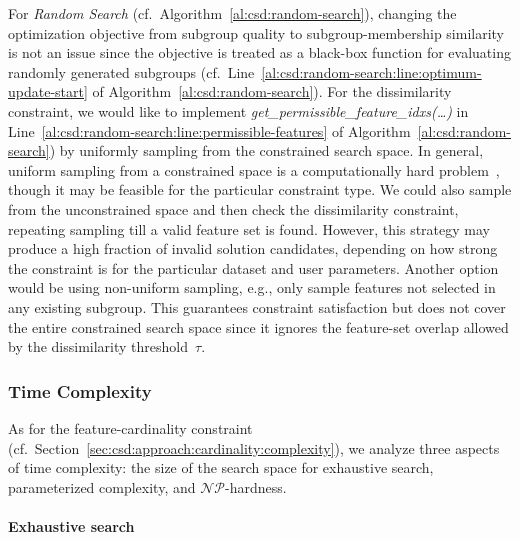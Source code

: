 \documentclass{article}
\theoremstyle{definition}
\begin{document}
For \emph{Random Search} (cf.~Algorithm~\ref{al:csd:random-search}), changing the optimization objective from subgroup quality to subgroup-membership similarity is not an issue since the objective is treated as a black-box function for evaluating randomly generated subgroups (cf.~Line~\ref{al:csd:random-search:line:optimum-update-start} of Algorithm~\ref{al:csd:random-search}).
For the dissimilarity constraint, we would like to implement \emph{get\_permissible\_feature\_idxs(\dots)} in Line~\ref{al:csd:random-search:line:permissible-features} of Algorithm~\ref{al:csd:random-search}) by uniformly sampling from the constrained search space.
In general, uniform sampling from a constrained space is a computationally hard problem~\cite{ermon2012uniform}, though it may be feasible for the particular constraint type.
We could also sample from the unconstrained space and then check the dissimilarity constraint, repeating sampling till a valid feature set is found.
However, this strategy may produce a high fraction of invalid solution candidates, depending on how strong the constraint is for the particular dataset and user parameters.
Another option would be using non-uniform sampling, e.g., only sample features not selected in any existing subgroup.
This guarantees constraint satisfaction but does not cover the entire constrained search space since it ignores the feature-set overlap allowed by the dissimilarity threshold~$\tau$.

\subsubsection{Time Complexity}
\label{sec:csd:approach:alternatives:complexity}

As for the feature-cardinality constraint (cf.~Section~\ref{sec:csd:approach:cardinality:complexity}), we analyze three aspects of time complexity:
the size of the search space for exhaustive search, parameterized complexity, and $\mathcal{NP}$-hardness.

\paragraph{Exhaustive search}
\end{document}
